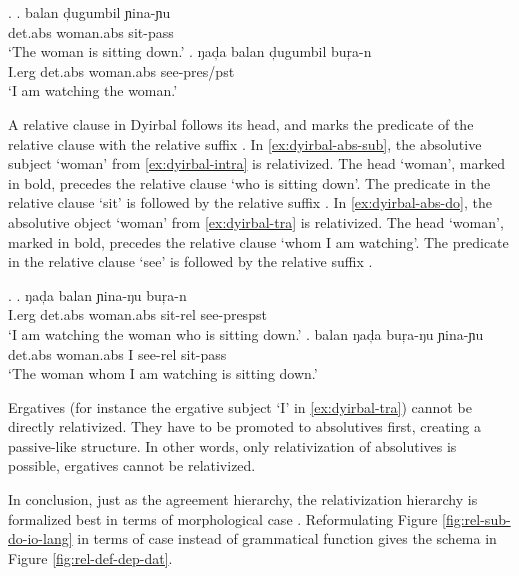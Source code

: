 \ex.\label{ex:dyirbal-decl}
\ag. balan d̦ugumbil ɲina-ɲu\\
 \ac{det}.\ac{abs} woman.\ac{abs} sit-\ac{pass}\\
 `The woman is sitting down.'\label{ex:dyirbal-intra}
\bg. ŋad̦a balan d̦ugumbil buŗa-n\\
 I.\ac{erg} \ac{det}.\ac{abs} woman.\ac{abs} see-\ac{pres}/\ac{pst}\\
 `I am watching the woman.'\label{ex:dyirbal-tra}

A relative clause in Dyirbal follows its head, and marks the predicate of the relative clause with the relative suffix .
In \ref{ex:dyirbal-abs-sub}, the absolutive subject  `woman' from \ref{ex:dyirbal-intra} is relativized. The head  `woman', marked in bold, precedes the relative clause  `who is sitting down'. The predicate in the relative clause  `sit' is followed by the relative suffix .
In \ref{ex:dyirbal-abs-do}, the absolutive object  `woman' from \ref{ex:dyirbal-tra} is relativized. The head  `woman', marked in bold, precedes the relative clause  `whom I am watching'. The predicate in the relative clause  `see' is followed by the relative suffix .

\ex.
\ag. ŋad̦a balan  ɲina-ŋu buŗa-n\\
 I.\ac{erg} \ac{det}.\ac{abs} woman.\ac{abs} sit-\ac{rel} see-\ac{pres}\ac{pst}\\
 `I am watching the woman who is sitting down.'\label{ex:dyirbal-abs-sub}
\bg. balan  ŋad̦a buŗa-ŋu ɲina-ɲu\\
 \ac{det}.\ac{abs} woman.\ac{abs} I see-\ac{rel} sit-\ac{pass}\\
 `The woman whom I am watching is sitting down.'\label{ex:dyirbal-abs-do}

Ergatives (for instance the ergative subject  `I' in \ref{ex:dyirbal-tra}) cannot be directly relativized. They have to be promoted to absolutives first, creating a passive-like structure. In other words, only relativization of absolutives is possible, ergatives cannot be relativized.

In conclusion, just as the agreement hierarchy, the relativization hierarchy is formalized best in terms of morphological case \citep[cf.][]{caha2009}. Reformulating Figure \ref{fig:rel-sub-do-io-lang} in terms of case instead of grammatical function gives the schema in Figure \ref{fig:rel-def-dep-dat}.

